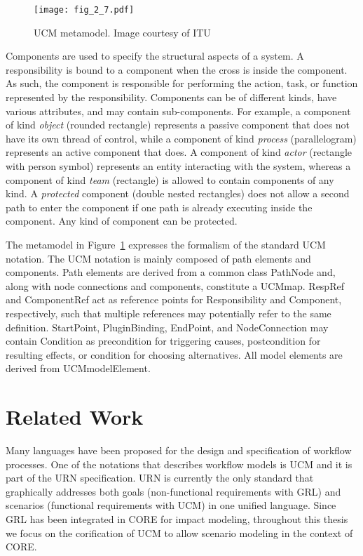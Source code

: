 \begin{figure}
	\centering
	\texttt{[image: fig\_2\_7.pdf]}
	\caption[UCM metamodel]{UCM metamodel. Image courtesy of ITU~\cite{itu2012151}}
	\label{fig:2.7}
\end{figure}

Components are used to specify the structural aspects of a system. A responsibility is bound to a component when the cross is inside the component. As such, the component is responsible for performing the action, task, or function represented by the responsibility. Components can be of different kinds, have various attributes, and may contain sub-components. For example, a component of kind \emph{object} (rounded rectangle) represents a passive component that does not have its own thread of control, while a component of kind \emph{process} (parallelogram) represents an active component that does. A component of kind \emph{actor} (rectangle with person symbol) represents an entity interacting with the system, whereas a component of kind \emph{team} (rectangle) is allowed to contain components of any kind. A \emph{protected} component (double nested rectangles) does not allow a second path to enter the component if one path is already executing inside the component. Any kind of component can be protected.

The metamodel in Figure~\ref{fig:2.7} expresses the formalism of the standard UCM notation. The UCM notation is mainly composed of path elements and components. Path elements are derived from a common class {\cls PathNode} and, along with node connections and components, constitute a {\cls UCMmap}. {\cls RespRef} and {\cls ComponentRef} act as reference points for {\cls Responsibility} and {\cls Component}, respectively, such that multiple references may potentially refer to the same definition. {\cls StartPoint}, {\cls PluginBinding}, {\cls EndPoint}, and {\cls NodeConnection} may contain {\cls Condition} as precondition for triggering causes, postcondition for resulting effects, or condition for choosing alternatives. All model elements are derived from {\cls UCMmodelElement}.

\section{Related Work} \label{sec:2.3}

Many languages have been proposed for the design and specification of workflow processes. One of the notations that describes workflow models is UCM and it is part of the URN specification. URN is currently the only standard that graphically addresses both goals (non-functional requirements with GRL) and scenarios (functional requirements with UCM) in one unified language. Since GRL has been integrated in CORE for impact modeling, throughout this thesis we focus on the corification of UCM to allow scenario modeling in the context of CORE.

